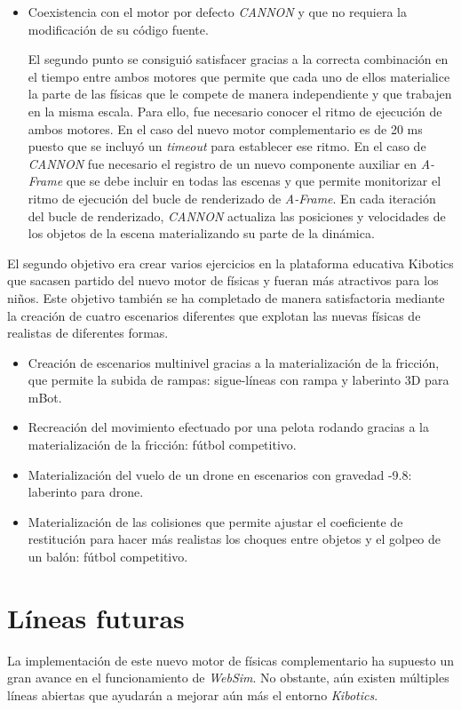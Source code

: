 \begin{itemize}
    \item Coexistencia con el motor por defecto \textit{CANNON} y que no requiera la modificación de su código fuente.
    
    El segundo punto se consiguió satisfacer gracias a la correcta combinación en el tiempo entre ambos motores que permite que cada uno de ellos materialice la parte de las físicas que le compete de manera independiente y que trabajen en la misma escala. Para ello, fue necesario conocer el ritmo de ejecución de ambos motores. En el caso del nuevo motor complementario es de 20 ms puesto que se incluyó un \textit{timeout} para establecer ese ritmo. En el caso de \textit{CANNON} fue necesario el registro de un nuevo componente auxiliar en \textit{A-Frame} que se debe incluir en todas las escenas y que permite monitorizar el ritmo de ejecución del bucle de renderizado de \textit{A-Frame}. En cada iteración del bucle de renderizado, \textit{CANNON} actualiza las posiciones y velocidades de los objetos de la escena materializando su parte de la dinámica.
\end{itemize}

El segundo objetivo era crear varios ejercicios en la plataforma educativa Kibotics que sacasen partido del nuevo motor de físicas y fueran más atractivos para los niños. Este objetivo también se ha completado de manera satisfactoria mediante la creación de cuatro escenarios diferentes que explotan las nuevas físicas de realistas de diferentes formas.

\begin{itemize}
    \item Creación de escenarios multinivel gracias a la materialización de la fricción, que permite la subida de rampas: sigue-líneas con rampa y laberinto 3D para mBot.
    \item Recreación del movimiento efectuado por una pelota rodando gracias a la materialización de la fricción: fútbol competitivo.
    \item Materialización del vuelo de un drone en escenarios con gravedad -9.8: laberinto para drone.
    \item Materialización de las colisiones que permite ajustar el coeficiente de restitución para hacer más realistas los choques entre objetos y el golpeo de un balón: fútbol competitivo.
\end{itemize}


\section{Líneas futuras}
La implementación de este nuevo motor de físicas complementario ha supuesto un gran avance en el funcionamiento de \textit{WebSim}. No obstante, aún existen múltiples líneas abiertas que ayudarán a mejorar aún más el entorno \textit{Kibotics}.

